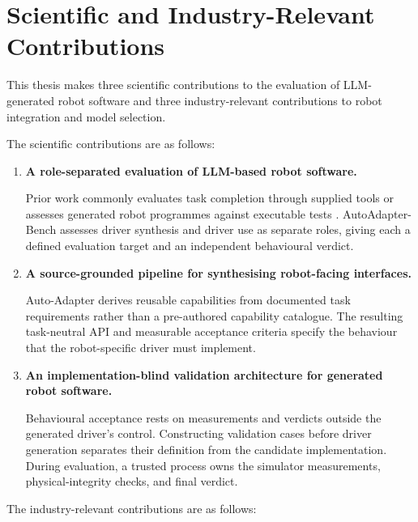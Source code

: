 \section[Scientific and Industry-Relevant Contributions]
{Scientific and Industry-Relevant Contributions}
\label{sec:intro-contributions}

This thesis makes three scientific contributions to the evaluation of
LLM-generated robot software and three industry-relevant contributions to
robot integration and model selection.

The scientific contributions are as follows:

\begin{enumerate}[leftmargin=*,itemsep=0.8em]

  \item \textbf{A role-separated evaluation of LLM-based robot software.}

  Prior work commonly evaluates task completion through supplied tools or
  assesses generated robot programmes against executable tests
  \citep{liang2023codeaspolicies,hu2024codebotler,fu2026capx}. AutoAdapter-Bench
  assesses driver synthesis and driver use as separate roles, giving each a
  defined evaluation target and an independent behavioural verdict.

  \item \textbf{A source-grounded pipeline for synthesising robot-facing
  interfaces.}

  Auto-Adapter derives reusable capabilities from documented task requirements
  rather than a pre-authored capability catalogue. The resulting task-neutral
  API and measurable acceptance criteria specify the behaviour that the
  robot-specific driver must implement.

  \item \textbf{An implementation-blind validation architecture for generated
  robot software.}

  Behavioural acceptance rests on measurements and verdicts outside the
  generated driver's control. Constructing validation cases before driver
  generation separates their definition from the candidate implementation.
  During evaluation, a trusted process owns the simulator measurements,
  physical-integrity checks, and final verdict.

\end{enumerate}

The industry-relevant contributions are as follows:

